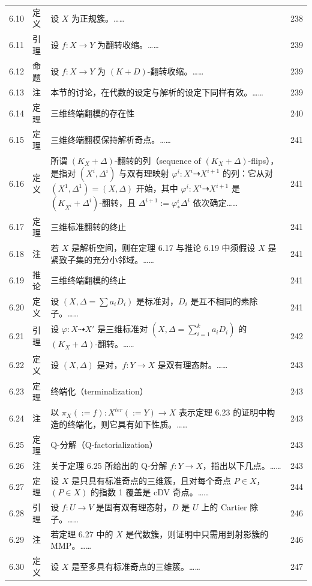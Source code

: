 \begin{longtable}{@{}p{}p{}p{}p{}@{}}
6.10 & 定义 & 设 $X$ 为正规簇。…… & 238 \\
6.11 & 引理 & 设 $f:X\to Y$ 为翻转收缩。…… & 239 \\
6.12 & 命题 & 设 $f:X\to Y$ 为 $(K+D)$-翻转收缩。…… & 239 \\
6.13 & 注 & 本节的讨论，在代数的设定与解析的设定下同样有效。…… & 239 \\
6.14 & 定理 & 三维终端翻模的存在性 & 240 \\
6.15 & 定理 & 三维终端翻模保持解析奇点。…… & 241 \\
6.16 & 定义 & 所谓 $(K_X+\Delta)$-翻转的列（sequence of $(K_X+\Delta)$-flips），是指对 $(X^i,\Delta^i)$ 与双有理映射 $\varphi^i:X^i\dashrightarrow X^{i+1}$ 的列：它从对 $(X^1,\Delta^1)=(X,\Delta)$ 开始，其中 $\varphi^i:X^i\dashrightarrow X^{i+1}$ 是 $(K_{X^i}+\Delta^i)$-翻转，且 $\Delta^{i+1}:=\varphi^i_*\Delta^i$ 依次确定…… & 241 \\
6.17 & 定理 & 三维标准翻转的终止 & 241 \\
6.18 & 注 & 若 $X$ 是解析空间，则在定理 6.17 与推论 6.19 中须假设 $X$ 是紧致子集的充分小邻域。…… & 241 \\
6.19 & 推论 & 三维终端翻模的终止 & 241 \\
6.20 & 定义 & 设 $(X,\Delta=\sum a_iD_i)$ 是标准对，$D_i$ 是互不相同的素除子。…… & 241 \\
6.21 & 引理 & 设 $\varphi:X\dashrightarrow X'$ 是三维标准对 $(X,\Delta=\sum_{i=1}^k a_iD_i)$ 的 $(K_X+\Delta)$-翻转。…… & 242 \\
6.22 & 定义 & 设 $(X,\Delta)$ 是对，$f:Y\to X$ 是双有理态射。…… & 243 \\
6.23 & 定理 & 终端化（terminalization） & 243 \\
6.24 & 注 & 以 $\pi_X(:=f):X^{ter}(:=Y)\to X$ 表示定理 6.23 的证明中构造的终端化，则它具有如下性质。…… & 243 \\
6.25 & 定理 & Q-分解（Q-factorialization） & 243 \\
6.26 & 注 & 关于定理 6.25 所给出的 Q-分解 $f:Y\to X$，指出以下几点。…… & 243 \\
6.27 & 定理 & 设 $X$ 是只具有标准奇点的三维簇，且对每个奇点 $P\in X$，$(P\in X)$ 的指数 1 覆盖是 cDV 奇点。…… & 244 \\
6.28 & 引理 & 设 $f:U\to V$ 是固有双有理态射，$D$ 是 $U$ 上的 Cartier 除子。…… & 246 \\
6.29 & 注 & 若定理 6.27 中的 $X$ 是代数簇，则证明中只需用到射影簇的 MMP。…… & 246 \\
6.30 & 定义 & 设 $X$ 是至多具有标准奇点的三维簇。…… & 247 \\

\end{longtable}
